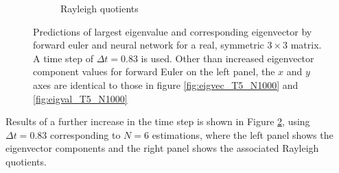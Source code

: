 \documentclass[12pt]{extarticle}
\begin{document}
\begin{figure}[h]
\begin{subfigure}{0.49\textwidth}
		\caption{Rayleigh quotients}
		\label{fig:eigval_T5_N6}
	\end{subfigure}
	\caption{Predictions of largest eigenvalue and corresponding eigenvector by forward euler and neural network for a real, symmetric $3\times 3$ matrix. A time step of $\Delta t = 0.83$ is used. Other than increased eigenvector component values for forward Euler on the left panel, the $x$ and $y$ axes are identical to those in figure \ref{fig:eigvec_T5_N1000} and \ref{fig:eigval_T5_N1000}}
	\label{fig:eig_T5_N6}
\end{figure}

Results of a further increase in the time step is shown in Figure \ref{fig:eig_T5_N6}, using $\Delta t= 0.83$ corresponding to $N=6$ estimations, where the left panel shows the eigenvector components and the right panel shows the associated Rayleigh quotients. 
\end{document}
